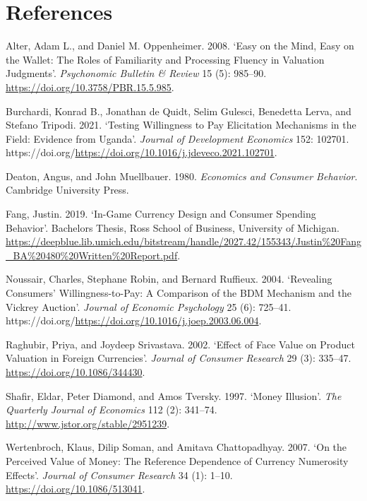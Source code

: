 \documentclass[
]{report}
\newlength{\cslhangindent}
\newenvironment{CSLReferences}[2] %
 {\begin{list}{}{%
  \setlength{\itemindent}{0pt}
  \setlength{\leftmargin}{0pt}
  \setlength{\parsep}{0pt}
  \ifodd #1
   \setlength{\leftmargin}{\cslhangindent}
   \setlength{\itemindent}{-1\cslhangindent}
  \fi
  \setlength{\itemsep}{#2\baselineskip}}}
 {\end{list}}
\begin{document}
\chapter{References}\label{references}

\label{refs}
\begin{CSLReferences}{1}{0}
Alter, Adam L., and Daniel M. Oppenheimer. 2008. {`Easy on the Mind,
Easy on the Wallet: The Roles of Familiarity and Processing Fluency in
Valuation Judgments'}. \emph{Psychonomic Bulletin {\&} Review} 15 (5):
985--90. \url{https://doi.org/10.3758/PBR.15.5.985}.

Burchardi, Konrad B., Jonathan de Quidt, Selim Gulesci, Benedetta Lerva,
and Stefano Tripodi. 2021. {`Testing Willingness to Pay Elicitation
Mechanisms in the Field: Evidence from Uganda'}. \emph{Journal of
Development Economics} 152: 102701.
https://doi.org/\url{https://doi.org/10.1016/j.jdeveco.2021.102701}.

Deaton, Angus, and John Muellbauer. 1980. \emph{Economics and Consumer
Behavior}. Cambridge University Press.

Fang, Justin. 2019. {`In-Game Currency Design and Consumer Spending
Behavior'}. Bachelor\textquotesingle s Thesis, Ross School of Business,
University of Michigan.
\url{https://deepblue.lib.umich.edu/bitstream/handle/2027.42/155343/Justin\%20Fang_BA\%20480\%20Written\%20Report.pdf}.

Noussair, Charles, Stephane Robin, and Bernard Ruffieux. 2004.
{`Revealing Consumers' Willingness-to-Pay: A Comparison of the BDM
Mechanism and the Vickrey Auction'}. \emph{Journal of Economic
Psychology} 25 (6): 725--41.
https://doi.org/\url{https://doi.org/10.1016/j.joep.2003.06.004}.

Raghubir, Priya, and Joydeep Srivastava. 2002. {`{Effect of Face Value
on Product Valuation in Foreign Currencies}'}. \emph{Journal of Consumer
Research} 29 (3): 335--47. \url{https://doi.org/10.1086/344430}.

Shafir, Eldar, Peter Diamond, and Amos Tversky. 1997. {`Money
Illusion'}. \emph{The Quarterly Journal of Economics} 112 (2): 341--74.
\url{http://www.jstor.org/stable/2951239}.

Wertenbroch, Klaus, Dilip Soman, and Amitava Chattopadhyay. 2007. {`{On
the Perceived Value of Money: The Reference Dependence of Currency
Numerosity Effects}'}. \emph{Journal of Consumer Research} 34 (1):
1--10. \url{https://doi.org/10.1086/513041}.

\end{CSLReferences}
\end{document}
